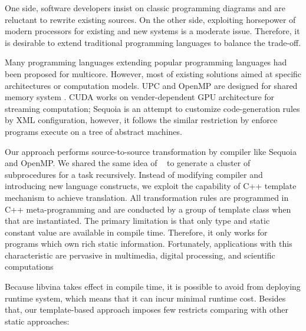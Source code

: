 \documentclass[10pt, conference, compsocconf]{IEEEtran}
\begin{document}
One side, software developers insist on classic programming diagrams and are reluctant to rewrite existing sources. On the other side, exploiting horsepower of modern processors for existing and new systems is a moderate issue. Therefore, it is desirable to extend traditional programming languages to balance the trade-off.

Many programming languages extending popular programming languages had been proposed for multicore. However, most of existing solutions aimed at specific architectures or computation models. UPC and OpenMP are designed for shared memory system \cite{b15}. CUDA works on vender-dependent GPU architecture for streaming computation; Sequoia \cite{b1} is an attempt to customize code-generation rules by XML configuration, however, it follows the similar restriction by enforce programs execute on a tree of abstract machines.

Our approach performs source-to-source transformation by compiler like Sequoia and OpenMP. We shared the same idea of  ~\cite{b1} to generate a cluster of subprocedures for a task recursively. Instead of modifying compiler and introducing new language constructs, we exploit the capability of C++ template mechanism to achieve translation. All transformation rules are programmed in C++ meta-programming \cite{b10} and are conducted by a group of template class when that are instantiated. The primary limitation is that only type and static constant value are available in compile time. Therefore, it only works for programs which own rich static information. Fortunately, applications with this characteristic are pervasive in multimedia, digital processing, and scientific computations 

Because libvina takes effect in compile time, it is possible to avoid from deploying runtime system, which means that it can incur minimal runtime cost. Besides that, our template-based approach imposes few restricts comparing with other static approaches:
\end{document}
